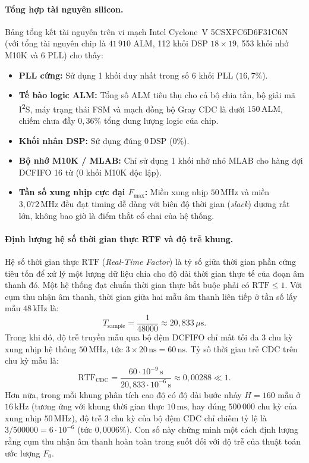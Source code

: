 \paragraph{Tổng hợp tài nguyên silicon.}
Bảng tổng kết tài nguyên trên vi mạch Intel Cyclone~V 5CSXFC6D6F31C6N (với tổng tài nguyên chip là $41\,910$ ALM, 112 khối DSP $18\times 19$, 553 khối nhớ M10K và 6 PLL) cho thấy:
\begin{itemize}
    \item \textbf{PLL cứng:} Sử dụng 1 khối duy nhất trong số 6 khối PLL ($16{,}7\%$).
    \item \textbf{Tế bào logic ALM:} Tổng số ALM tiêu thụ cho cả bộ chia tần, bộ giải mã I\textsuperscript{2}S, máy trạng thái FSM và mạch đồng bộ Gray CDC là dưới $150\,\text{ALM}$, chiếm chưa đầy $0{,}36\%$ tổng dung lượng logic của chip.
    \item \textbf{Khối nhân DSP:} Sử dụng đúng $0\,\text{DSP}$ ($0\%$).
    \item \textbf{Bộ nhớ M10K / MLAB:} Chỉ sử dụng 1 khối nhớ nhỏ MLAB cho hàng đợi DCFIFO 16 từ ($0$ khối M10K độc lập).
    \item \textbf{Tần số xung nhịp cực đại $F_{\max}$:} Miền xung nhịp $50\,\text{MHz}$ và miền $3{,}072\,\text{MHz}$ đều đạt timing dễ dàng với biên độ thời gian (\emph{slack}) dương rất lớn, không bao giờ là điểm thắt cổ chai của hệ thống.
\end{itemize}

\paragraph{Định lượng hệ số thời gian thực RTF và độ trễ khung.}
Hệ số thời gian thực $\mathrm{RTF}$ (\emph{Real-Time Factor}) là tỷ số giữa thời gian phần cứng tiêu tốn để xử lý một lượng dữ liệu chia cho độ dài thời gian thực tế của đoạn âm thanh đó. Một hệ thống đạt chuẩn thời gian thực bắt buộc phải có $\mathrm{RTF} \le 1$. Với cụm thu nhận âm thanh, thời gian giữa hai mẫu âm thanh liên tiếp ở tần số lấy mẫu $48\,\text{kHz}$ là:
\begin{equation}
T_{\mathrm{sample}} = \frac{1}{48000} \approx 20{,}833\,\mu\mathrm{s}.
\end{equation}
Trong khi đó, độ trễ truyền mẫu qua bộ đệm DCFIFO chỉ mất tối đa 3 chu kỳ xung nhịp hệ thống $50\,\text{MHz}$, tức $3 \times 20\,\text{ns} = 60\,\text{ns}$. Tỷ số thời gian trễ CDC trên chu kỳ mẫu là:
\begin{equation}
\mathrm{RTF}_{\mathrm{CDC}} = \frac{60\cdot 10^{-9}\,\text{s}}{20{,}833\cdot 10^{-6}\,\text{s}} \approx 0{,}00288 \ll 1.
\end{equation}
Hơn nữa, trong mỗi khung phân tích cao độ có độ dài bước nhảy $H = 160$ mẫu ở $16\,\text{kHz}$ (tương ứng với khung thời gian thực $10\,\text{ms}$, hay đúng $500\,000$ chu kỳ của xung nhịp $50\,\text{MHz}$), độ trễ 3 chu kỳ của bộ đệm CDC chỉ chiếm tỷ lệ là $3 / 500000 = 6\cdot 10^{-6}$ (tức $0{,}0006\%$). Con số này chứng minh một cách định lượng rằng cụm thu nhận âm thanh hoàn toàn trong suốt đối với độ trễ của thuật toán ước lượng $F_0$.


